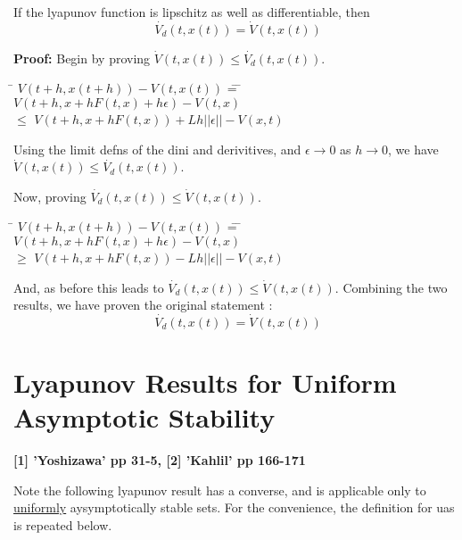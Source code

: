 \begin{therm}
  If the lyapunov function is lipschitz as well as differentiable, then
  \[ \dot{V_{d}}(t,x(t)) = \dot{V}(t,x(t)) \]
\end{therm}

\begin{footnotesize}
  {\bf  Proof:}
  Begin by proving $\dot{V}(t,x(t)) \leq \dot{V_{d}}(t,x(t))$.

  \begin{tabbing}
    \hspace{1in} \= $V(t+h,x(t+h)) - V(t,x(t))$ \= = \= $V(t+h,x+hF(t,x) +
                   h \epsilon ) - V(t,x)$ \\
    \> \> $\leq$ \> $V(t+h,x+hF(t,x)) + Lh||\epsilon|| - V(x,t)$ \\
  \end{tabbing}
  Using the limit defns of the dini and derivitives, and $\epsilon
  \rightarrow 0$ as $h \rightarrow 0$, we have $\dot{V}(t,x(t)) \leq
  \dot{V_{d}}(t,x(t))$.

  Now, proving $\dot{V_{d}}(t,x(t)) \leq \dot{V}(t,x(t))$.

  \begin{tabbing}
    \hspace{1in} \= $V(t+h,x(t+h)) - V(t,x(t))$ \= = \= $V(t+h,x+hF(t,x) +
                   h \epsilon ) - V(t,x)$ \\
    \> \> $\geq$ \> $V(t+h,x+hF(t,x)) - Lh||\epsilon|| - V(x,t)$ \\
  \end{tabbing}
  And, as before this leads to $\dot{V_{d}}(t,x(t)) \leq \dot{V}(t,x(t))$.
  Combining the two results, we have proven the original statement :
  \[ \dot{V_{d}}(t,x(t)) = \dot{V}(t,x(t)) \]
\end{footnotesize}

\section{Lyapunov Results for Uniform Asymptotic Stability}

{\bf [1] 'Yoshizawa' pp 31-5, [2] 'Kahlil' pp 166-171}

Note the following lyapunov result has a converse, and is applicable only to
\underline{uniformly} aysymptotically stable sets. For the convenience, the
definition for uas is repeated below.

